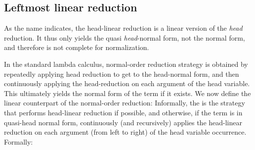 \documentclass{elsarticle}
\theoremstyle{plain}
\theoremstyle{definition}
\theoremstyle{remark}
\begin{document}
\subsection{Leftmost linear reduction}

As the name indicates, the head-linear reduction is a linear version of the \emph{head} reduction. It thus only yields the quasi \emph{head}-normal form, not the normal form, and therefore is not complete for normalization.

In the standard lambda calculus, normal-order reduction strategy is obtained by repeatedly applying head reduction to get to the head-normal form, and then continuously applying the head-reduction on each argument of the head variable.
This ultimately yields the normal form of the term if it exists.
We now define the linear counterpart of the normal-order reduction: Informally, the  is the strategy that performs head-linear reduction if possible, and otherwise, if the term is in quasi-head normal form, continuously (and recursively) applies the head-linear reduction on each argument (from left to right) of the head variable occurrence.
Formally:
\end{document}
